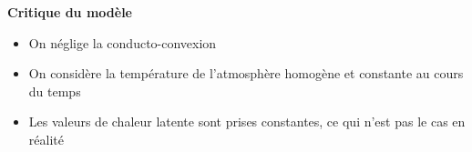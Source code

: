 \documentclass[a4paper,12pt]{article}
\begin{document}
\textbf{Critique du modèle}

\begin{itemize}
    \item On néglige la conducto-convexion
    \item On considère la température de l'atmosphère homogène et constante au cours du temps
    \item Les valeurs de chaleur latente sont prises constantes, ce qui n'est pas le cas en réalité
\end{itemize}
\end{document}
